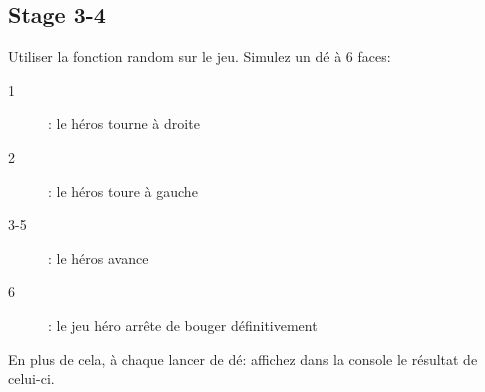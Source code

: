 \subsection{Stage 3-4}

Utiliser la fonction random sur le jeu.
Simulez un dé à 6 faces:
\begin{description}
	\item[1]: le héros tourne à droite
	\item[2]: le héros toure à gauche
	\item[3-5]: le héros avance
	\item[6]: le jeu héro arrête de bouger définitivement
\end{description}

En plus de cela, à chaque lancer de dé: affichez dans la console le résultat de celui-ci.


